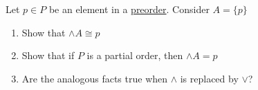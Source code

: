 Let $p \in P$ be an element in a \hyperref[D1.30]{preorder}. Consider $A = \{p\}$

    \begin{enumerate}
      \item Show that $\wedge A \cong p$
      \item Show that if $P$ is a partial order, then $\wedge A = p$
      \item Are the analogous facts true when $\wedge$ is replaced by $\vee$?
    \end{enumerate}